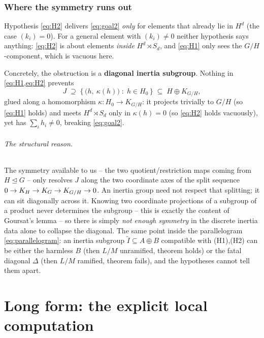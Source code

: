 \documentclass[11pt]{article}
\begin{document}
\section{Where the symmetry runs out}\label{sec:stall}

Hypothesis \cref{eq:H2} delivers \cref{eq:goal2} \emph{only} for elements that
already lie in $H^d$ (the case $(k_i)=0$). For a general element with
$(k_i)\neq0$ neither hypothesis says anything: \cref{eq:H2} is about elements
\emph{inside} $H^d\rtimes S_d$, and \cref{eq:H1} only sees the $G/H$-component,
which is vacuous here.

Concretely, the obstruction is a \textbf{diagonal inertia subgroup}. Nothing in
\cref{eq:H1,eq:H2} prevents
\begin{equation}\label{eq:diagonal}
J \;\supseteq\; \big\{\, \big(h,\ \kappa(h)\big) \;:\; h\in H_0 \,\big\}
\;\subseteq\; H \oplus K_{G/H},
\end{equation}
glued along a homomorphism $\kappa:H_0\to K_{G/H}$: it projects trivially to
$G/H$ (so \cref{eq:H1} holds) and meets $H^d\rtimes S_d$ only in $\kappa(h)=0$
(so \cref{eq:H2} holds vacuously), yet has $\sum_i h_i\neq0$, breaking
\cref{eq:goal2}.

\paragraph{The structural reason.}
The symmetry available to us -- the two quotient/restriction maps coming from
$H\trianglelefteq G$ -- only resolves $J$ along the two coordinate axes of the
split sequence $0\to K_H\to K_{G}\to K_{G/H}\to0$. An inertia group need not
respect that splitting; it can sit diagonally across it. Knowing two coordinate
projections of a subgroup of a product never determines the subgroup -- this is
exactly the content of Goursat's lemma -- so there is simply \emph{not enough
symmetry} in the discrete inertia data alone to collapse the diagonal. The same
point inside the parallelogram \cref{eq:parallelogram}: an inertia subgroup
$\widetilde I\subseteq A\oplus B$ compatible with (H1),(H2) can be either the
harmless $B$ (then $L/M$ unramified, theorem holds) or the fatal diagonal
$\Delta$ (then $L/M$ ramified, theorem fails), and the hypotheses cannot tell
them apart.

\part{Long form: the explicit local computation}\label{part:long}
\end{document}
